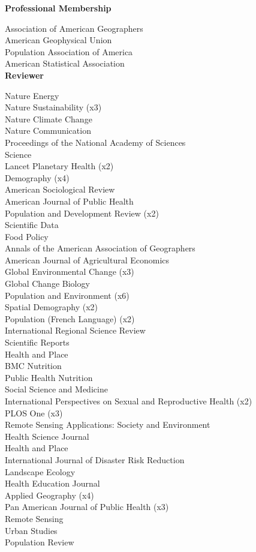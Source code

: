 \documentclass[11pt]{article} %
\begin{document}
\noindent
\textbf{Professional Membership}

\noindent
Association of American Geographers\\
American Geophysical Union\\
Population Association of America\\
American Statistical Association\\

\vspace{.5 cm}
\noindent
\textbf {Reviewer}

\noindent 
Nature Energy\\
Nature Sustainability (x3)\\
Nature Climate Change\\
Nature Communication\\
Proceedings of the National Academy of Sciences\\
Science\\ 
Lancet Planetary Health (x2)\\
Demography (x4)\\
American Sociological Review\\
American Journal of Public Health\\
Population and Development Review (x2)\\ 
Scientific Data\\
Food Policy\\
Annals of the American Association of Geographers\\
American Journal of Agricultural Economics\\
Global Environmental Change (x3)\\
Global Change Biology\\
Population and Environment (x6)\\
Spatial Demography (x2)\\
Population (French Language) (x2)\\
International Regional Science Review\\
Scientific Reports\\
Health and Place\\
BMC Nutrition\\ 
Public Health Nutrition\\
Social Science and Medicine\\
International Perspectives on Sexual and Reproductive Health (x2)\\ 
PLOS One (x3)\\
Remote Sensing Applications: Society and Environment\\
Health Science Journal\\
Health and Place\\
International Journal of Disaster Risk Reduction\\
Landscape Ecology\\
Health Education Journal\\
Applied Geography (x4)\\ 
Pan American Journal of Public Health (x3)\\ 
Remote Sensing\\
Urban Studies\\
Population Review\\
\end{document}
